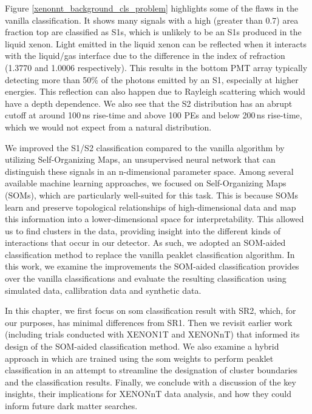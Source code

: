 Figure \ref{xenonnt_background_cls_problem} highlights some of the flaws in the vanilla classification. It shows many signals with a high (greater than 0.7) area fraction top are classified as S1s, which is unlikely to be an S1s produced in the liquid xenon. Light emitted in the liquid xenon can be reflected when it interacts with the liquid/gas interface due to the difference in the index of refraction (1.3770 and 1.0006 respectively). This results in the bottom PMT array typically detecting more than 50\% of the photons emitted by an S1, especially at higher energies.
This reflection can also happen due to Rayleigh scattering which would have a depth dependence. We also see that the S2 distribution has an abrupt cutoff at around 100\,ns rise-time and above 100 PEs and below 200\,ns rise-time, which we would not expect from a natural distribution. 


We improved the S1/S2 classification compared to the vanilla algorithm by utilizing Self-Organizing Maps, an unsupervised neural network that can distinguish these signals in an n-dimensional parameter space.  Among several available machine learning approaches, we focused on Self-Organizing Maps (SOMs), which are particularly well-suited for this task. This is because SOMs learn and preserve topological relationships of high-dimensional data and map this information into a lower-dimensional space for interpretability. 
This allowed us to find clusters in the data, providing insight into the different kinds of interactions that occur in our detector. As such, we adopted an SOM-aided classification method to replace the vanilla peaklet classification algorithm. In this work, we examine the improvements the SOM-aided classification provides over the vanilla classifications and evaluate the resulting classification using simulated data, callibration data and synthetic data.

In this chapter, we first focus on \acrshort{som} classification result with SR2, which, for our purposes, has minimal differences from SR1. Then we revisit earlier work (including trials conducted with XENON1T and XENONnT) that informed its design of the SOM-aided classification method. We also examine a hybrid approach in which  are trained using the \acrshort{som} weights to perform peaklet classification in an attempt to streamline the designation of cluster boundaries and the classification results. Finally, we conclude with a discussion of the key insights, their implications for XENONnT data analysis, and how they could inform future dark matter searches.


